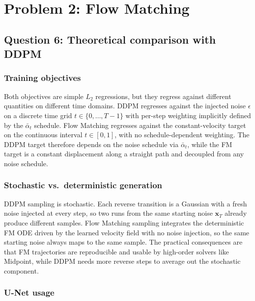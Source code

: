 \documentclass{article}
\begin{document}
\section*{Problem 2: Flow Matching}

\subsection*{Question 6: Theoretical comparison with DDPM}

\subsubsection*{Training objectives}

Both objectives are simple $L_2$ regressions, but they regress against
different quantities on different time domains. DDPM regresses against the
injected noise $\epsilon$ on a discrete time grid $t \in \{0, \ldots, T-1\}$
with per-step weighting implicitly defined by the $\bar\alpha_t$ schedule.
Flow Matching regresses against the constant-velocity target on the
continuous interval $t \in [0, 1]$, with no schedule-dependent weighting.
The DDPM target therefore depends on the noise schedule via $\bar\alpha_t$,
while the FM target is a constant displacement along a straight path and
decoupled from any noise schedule.

\subsubsection*{Stochastic vs.\ deterministic generation}

DDPM sampling is stochastic. Each reverse transition is a Gaussian with a
fresh noise injected at every step, so two runs from the same starting
noise $\mathbf{x}_T$ already produce different samples. Flow Matching
sampling integrates the deterministic FM ODE driven by the learned
velocity field with no noise injection, so the same starting noise always
maps to the same sample. The practical consequences are that FM
trajectories are reproducible and usable by high-order solvers like
Midpoint, while DDPM needs more reverse steps to average out the
stochastic component.

\subsubsection*{U-Net usage}
\end{document}
